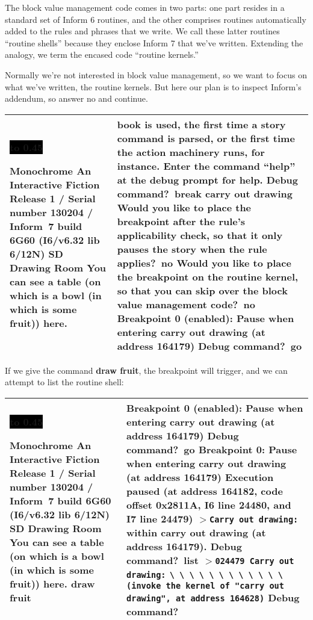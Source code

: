 \documentclass{book}
\newcommand{\n}{\hspace*{\fill}\newline}
\newcommand{\terp}[2]{\begin{center}\begin{tabular}{p{0.45\textwidth}|p{0.45\textwidth}}\midrule #1&#2\\\midrule\end{tabular}\end{center}}
\newcommand{\glkheading}[1]{\textbf{#1}}
\newcommand{\glkinput}[1]{\textbf{#1}}
\newcommand{\glkstatusline}[2]{\centerline{\colorbox{black}{\hbox to 0.45\textwidth{\textcolor{white}{#1\hfil #2}}}}}
\newcommand{\storyprompt}{\raisebox{1.5pt}{\(>\)}}
\newcommand{\cursor}{\raisebox{-1.5pt}{\RectangleThin}}
\newcommand{\markedindent}{\(>\)\qquad}
\newcommand{\unmarkedindent}{\hphantom{\(>\)}\qquad}
\begin{document}
The block value management code comes in two parts: one part resides in a
standard set of Inform 6 routines, and the other comprises routines
automatically added to the rules and phrases that we write.  We call these
latter routines ``routine shells'' because they enclose Inform 7 that we've
written.  Extending the analogy, we term the encased code ``routine kernels.''

Normally we're not interested in block value management, so we want to focus on
what we've written, the routine kernels.  But here our plan is to inspect
Inform's addendum, so answer no and continue.

\terp{\glkstatusline{Drawing Room}{0/1}\n
  \glkheading{Monochrome}\n
  An Interactive Fiction\n
  Release 1 / Serial number 130204 / Inform~7 build 6G60 (I6/v6.32 lib 6/12N) SD\n
  \n
  \glkheading{Drawing Room}\n
  You can see a table (on which is a bowl (in which is some fruit)) here.\n
  \n
  \storyprompt\cursor}{%
  book is used, the first time a story command is parsed, or the first time the action machinery runs, for instance.\n
  \n
  Enter the command ``help'' at the debug prompt for help.\n
  \n
  Debug command?\ \glkinput{break carry out drawing}\n
  \n
  Would you like to place the breakpoint after the rule's applicability check, so that it only pauses the story when the rule applies?\ \glkinput{no}\n
  \n
  Would you like to place the breakpoint on the routine kernel, so that you can skip over the block value management code?\ \glkinput{no}\n
  \n
  Breakpoint 0 (enabled): Pause when entering carry out drawing (at address 164179)\n
  \n
  Debug command?\ \glkinput{go}}

If we give the command \glkinput{draw fruit}, the breakpoint will trigger, and
we can attempt to list the routine shell:

\terp{\glkstatusline{Drawing Room}{0/1}\n
  \glkheading{Monochrome}\n
  An Interactive Fiction\n
  Release 1 / Serial number 130204 / Inform~7 build 6G60 (I6/v6.32 lib 6/12N) SD\n
  \n
  \glkheading{Drawing Room}\n
  You can see a table (on which is a bowl (in which is some fruit)) here.\n
  \n
  \storyprompt\glkinput{draw fruit}}{%
  \n
  Breakpoint 0 (enabled): Pause when entering carry out drawing (at address 164179)\n
  \n
  Debug command?\ \glkinput{go}\n
  \n
  \glkheading{Breakpoint 0:} Pause when entering carry out drawing (at address 164179)\n
  \n
  Execution paused (at address 164182, code offset 0x2811A, I6 line 24480, and I7 line 24479)\n
  \markedindent \lstinline{Carry out drawing:}\n
  within carry out drawing (at address 164179).\n
  \n
  Debug command?\ \glkinput{list}\n
  \n
  \markedindent \lstinline{024479 Carry out drawing:}\n
  \unmarkedindent \lstinline{\ \ \ \ \ \ \ \ \ \ \ \ (invoke the kernel of "carry out drawing", at address 164628)}\n
  \n
  Debug command?\ \cursor}
\end{document}
